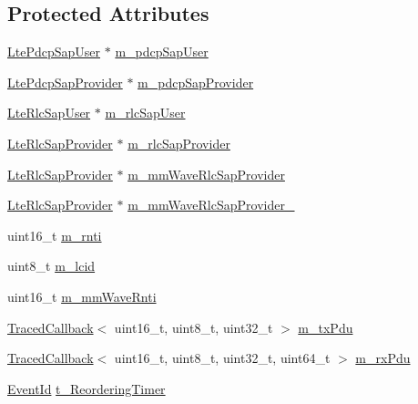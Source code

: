 \subsection*{Protected Attributes}
\begin{DoxyCompactItemize}
\item 
\hyperlink{classns3_1_1LtePdcpSapUser}{Lte\+Pdcp\+Sap\+User} $\ast$ \hyperlink{classns3_1_1McUePdcp_af635790c71e70f53a4295ffeafd43a05}{m\+\_\+pdcp\+Sap\+User}
\item 
\hyperlink{classns3_1_1LtePdcpSapProvider}{Lte\+Pdcp\+Sap\+Provider} $\ast$ \hyperlink{classns3_1_1McUePdcp_a724d5f96bc3aa079b77d03fc06b413c6}{m\+\_\+pdcp\+Sap\+Provider}
\item 
\hyperlink{classns3_1_1LteRlcSapUser}{Lte\+Rlc\+Sap\+User} $\ast$ \hyperlink{classns3_1_1McUePdcp_ad20f34925c9db7063ab6cb98524b9425}{m\+\_\+rlc\+Sap\+User}
\item 
\hyperlink{classns3_1_1LteRlcSapProvider}{Lte\+Rlc\+Sap\+Provider} $\ast$ \hyperlink{classns3_1_1McUePdcp_aa86e9bf17a9f0ae8f66f884f06e63348}{m\+\_\+rlc\+Sap\+Provider}
\item 
\hyperlink{classns3_1_1LteRlcSapProvider}{Lte\+Rlc\+Sap\+Provider} $\ast$ \hyperlink{classns3_1_1McUePdcp_a8575b586e150b7993bbd20a6dfc99bdd}{m\+\_\+mm\+Wave\+Rlc\+Sap\+Provider}
\item 
\hyperlink{classns3_1_1LteRlcSapProvider}{Lte\+Rlc\+Sap\+Provider} $\ast$ \hyperlink{classns3_1_1McUePdcp_a5d205a08976f4e830a92ed1cac396fee}{m\+\_\+mm\+Wave\+Rlc\+Sap\+Provider\+\_}
\item 
uint16\+\_\+t \hyperlink{classns3_1_1McUePdcp_a5807c425f6989fee6982fc11fdb5e9a9}{m\+\_\+rnti}
\item 
uint8\+\_\+t \hyperlink{classns3_1_1McUePdcp_ad68b36aee03df89a1d476f78c0db4bbc}{m\+\_\+lcid}
\item 
uint16\+\_\+t \hyperlink{classns3_1_1McUePdcp_a1089c35e05109655bbba37098d839139}{m\+\_\+mm\+Wave\+Rnti}
\item 
\hyperlink{classns3_1_1TracedCallback}{Traced\+Callback}$<$ uint16\+\_\+t, uint8\+\_\+t, uint32\+\_\+t $>$ \hyperlink{classns3_1_1McUePdcp_abe2ab1ab1b1e577e104aeb580b810558}{m\+\_\+tx\+Pdu}
\item 
\hyperlink{classns3_1_1TracedCallback}{Traced\+Callback}$<$ uint16\+\_\+t, uint8\+\_\+t, uint32\+\_\+t, uint64\+\_\+t $>$ \hyperlink{classns3_1_1McUePdcp_abc1e053fc92c4e96633a914c8ef5ed53}{m\+\_\+rx\+Pdu}
\item 
\hyperlink{classns3_1_1EventId}{Event\+Id} \hyperlink{classns3_1_1McUePdcp_a8fe243aa42a9c20d7c06d273076dbff8}{t\+\_\+\+Reordering\+Timer}
\end{DoxyCompactItemize}
